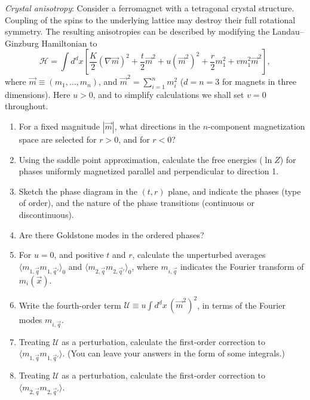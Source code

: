 \begin{problem}
    \textit{Crystal anisotropy}: Consider a ferromagnet with a tetragonal crystal structure. Coupling of the spins to the underlying lattice may destroy their full rotational symmetry. The resulting anisotropies can be described by modifying the Landau--Ginzburg Hamiltonian to
    \[
        \mathcal{H} = \int d^dx\left[\frac{K}{2}(\nabla\vec{m})^2 + \frac{t}{2}\vec{m}^2 + u(\vec{m}^2)^2 + \frac{r}{2}m_1^2 + vm_1^2\vec{m}^2\right],
    \]
    where $\vec{m} \equiv (m_1, \ldots, m_n)$, and $\vec{m}^2 = \sum_{i=1}^n m_i^2$ ($d = n = 3$ for magnets in three dimensions). Here $u > 0$, and to simplify calculations we shall set $v = 0$ throughout.

    \begin{enumerate}
        \item[(a)] For a fixed magnitude $|\vec{m}|$, what directions in the $n$-component magnetization space are selected for $r > 0$, and for $r < 0$?

        \item[(b)] Using the saddle point approximation, calculate the free energies ($\ln Z$) for phases uniformly magnetized parallel and perpendicular to direction 1.

        \item[(c)] Sketch the phase diagram in the $(t,r)$ plane, and indicate the phases (type of order), and the nature of the phase transitions (continuous or discontinuous).

        \item[(d)] Are there Goldstone modes in the ordered phases?

        \item[(e)] For $u = 0$, and positive $t$ and $r$, calculate the unperturbed averages $\langle m_{1,\vec{q}}m_{1,\vec{q}'}\rangle_0$ and $\langle m_{2,\vec{q}}m_{2,\vec{q}'}\rangle_0$, where $m_{i,\vec{q}}$ indicates the Fourier transform of $m_i(\vec{x})$.

        \item[(f)] Write the fourth-order term $\mathcal{U} \equiv u\int d^dx\,(\vec{m}^2)^2$, in terms of the Fourier modes $m_{i,\vec{q}}$.

        \item[(g)] Treating $\mathcal{U}$ as a perturbation, calculate the first-order correction to $\langle m_{1,\vec{q}}m_{1,\vec{q}'}\rangle$. (You can leave your answers in the form of some integrals.)

        \item[(h)] Treating $\mathcal{U}$ as a perturbation, calculate the first-order correction to $\langle m_{2,\vec{q}}m_{2,\vec{q}'}\rangle$.


\end{enumerate}
\end{problem}
